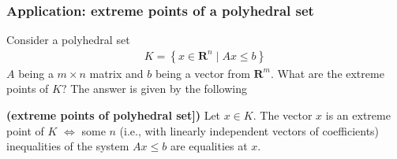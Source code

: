 \documentclass{article}
\newcommand{\bfs}[1]{\textbf{({#1}) }}
\begin{document}
\subsubsection{Application: extreme points of a polyhedral set}
Consider a polyhedral set
\begin{align*}
K=\left\{x \in \mathbf{R}^{n} \mid A x \leq b\right\}
\end{align*}
$A$ being a $m \times n$ matrix and $b$ being a vector from $\mathbf{R}^{m}$. What are the extreme points of $K ?$ The answer is given by the following
\begin{thma}{\bfs{extreme points of polyhedral set]}}
Let $x \in K$. The vector $x$ is an extreme point of $K$ $\Longleftrightarrow$ some $n$  (i.e., with linearly independent vectors of coefficients) inequalities of the system $A x \leq b$ are equalities at $x$.
\end{thma}
\end{document}
